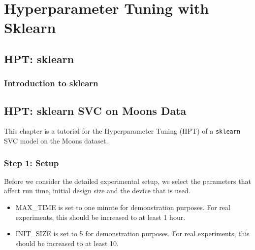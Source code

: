 \documentclass[
  letterpaper,
  DIV=11,
  numbers=noendperiod]{scrreprt}
\providecommand{\tightlist}{%
  \setlength{\itemsep}{0pt}\setlength{\parskip}{0pt}}\usepackage{longtable,booktabs,array}
\begin{document}
\part{Hyperparameter Tuning with Sklearn}

\hypertarget{sec-hpt-sklearn}{%
\chapter{HPT: sklearn}\label{sec-hpt-sklearn}}

\hypertarget{sec-hpt-sklearn-intro}{%
\section{Introduction to sklearn}\label{sec-hpt-sklearn-intro}}

\hypertarget{sec-hpt-sklearn-svc}{%
\chapter{HPT: sklearn SVC on Moons Data}\label{sec-hpt-sklearn-svc}}

This chapter is a tutorial for the Hyperparameter Tuning (HPT) of a
\texttt{sklearn} SVC model on the Moons dataset.

\hypertarget{sec-setup-10}{%
\section{Step 1: Setup}\label{sec-setup-10}}

Before we consider the detailed experimental setup, we select the
parameters that affect run time, initial design size and the device that
is used.

\begin{tcolorbox}[enhanced jigsaw, left=2mm, toprule=.15mm, colframe=quarto-callout-caution-color-frame, leftrule=.75mm, title=\textcolor{quarto-callout-caution-color}{\faFire}\hspace{0.5em}{Caution: Run time and initial design size should be increased for real
experiments}, toptitle=1mm, opacitybacktitle=0.6, arc=.35mm, titlerule=0mm, opacityback=0, bottomtitle=1mm, coltitle=black, rightrule=.15mm, colback=white, colbacktitle=quarto-callout-caution-color!10!white, breakable, bottomrule=.15mm]

\begin{itemize}
\tightlist
\item
  MAX\_TIME is set to one minute for demonstration purposes. For real
  experiments, this should be increased to at least 1 hour.
\item
  INIT\_SIZE is set to 5 for demonstration purposes. For real
  experiments, this should be increased to at least 10.
\end{itemize}

\end{tcolorbox}
\end{document}
